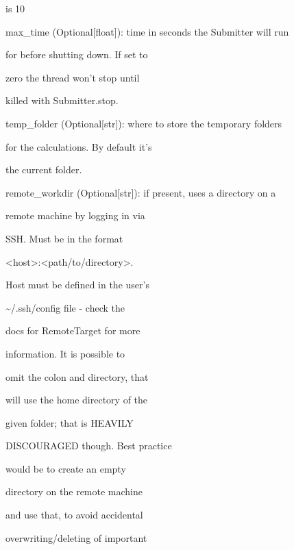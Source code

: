 \documentclass[letterpaper,10pt,english]{sphinxmanual}
\begin{document}
\begin{fulllineitems}
\begin{DUlineblock}{0em}
\begin{DUlineblock}{\DUlineblockindent}
\begin{DUlineblock}{\DUlineblockindent}
\item[] is 10
\end{DUlineblock}
\item[] max\_time (Optional{[}float{]}): time in seconds the Submitter will run
\item[]
\begin{DUlineblock}{\DUlineblockindent}
\item[] for before shutting down. If set to
\item[] zero the thread won't stop until
\item[] killed with Submitter.stop.
\end{DUlineblock}
\item[] temp\_folder (Optional{[}str{]}): where to store the temporary folders
\item[]
\begin{DUlineblock}{\DUlineblockindent}
\item[] for the calculations. By default it's
\item[] the current folder.
\end{DUlineblock}
\item[] remote\_workdir (Optional{[}str{]}): if present, uses a directory on a
\item[]
\begin{DUlineblock}{\DUlineblockindent}
\item[] remote machine by logging in via
\item[] SSH. Must be in the format
\item[] \textless{}host\textgreater{}:\textless{}path/to/directory\textgreater{}.
\item[] Host must be defined in the user's
\item[] \textasciitilde{}/.ssh/config file - check the
\item[] docs for RemoteTarget for more
\item[] information. It is possible to
\item[] omit the colon and directory, that
\item[] will use the home directory of the
\item[] given folder; that is HEAVILY
\item[] DISCOURAGED though. Best practice
\item[] would be to create an empty
\item[] directory on the remote machine
\item[] and use that, to avoid accidental
\item[] overwriting/deleting of important

\end{DUlineblock}
\end{DUlineblock}
\end{DUlineblock}
\end{fulllineitems}
\end{document}
